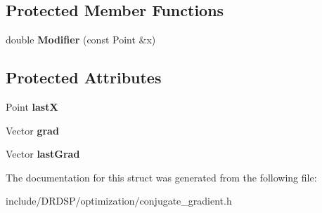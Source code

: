 \subsection*{Protected Member Functions}
\begin{DoxyCompactItemize}
\item 
\hypertarget{struct_d_r_d_s_p_1_1_conjugate_gradient_a8a0a119d801dbd3ec2aad9b906d4e08f}{double {\bfseries Modifier} (const Point \&x)}\label{struct_d_r_d_s_p_1_1_conjugate_gradient_a8a0a119d801dbd3ec2aad9b906d4e08f}

\end{DoxyCompactItemize}
\subsection*{Protected Attributes}
\begin{DoxyCompactItemize}
\item 
\hypertarget{struct_d_r_d_s_p_1_1_conjugate_gradient_a59ac9a080d4a359f07902246468e0055}{Point {\bfseries last\-X}}\label{struct_d_r_d_s_p_1_1_conjugate_gradient_a59ac9a080d4a359f07902246468e0055}

\item 
\hypertarget{struct_d_r_d_s_p_1_1_conjugate_gradient_ad568881f7bacc36d04e3ac1aea0a22f9}{Vector {\bfseries grad}}\label{struct_d_r_d_s_p_1_1_conjugate_gradient_ad568881f7bacc36d04e3ac1aea0a22f9}

\item 
\hypertarget{struct_d_r_d_s_p_1_1_conjugate_gradient_a5cb630cdcd16d2b96eb94b78a619a5b6}{Vector {\bfseries last\-Grad}}\label{struct_d_r_d_s_p_1_1_conjugate_gradient_a5cb630cdcd16d2b96eb94b78a619a5b6}

\end{DoxyCompactItemize}


The documentation for this struct was generated from the following file\-:\begin{DoxyCompactItemize}
\item 
include/\-D\-R\-D\-S\-P/optimization/conjugate\-\_\-gradient.\-h\end{DoxyCompactItemize}
